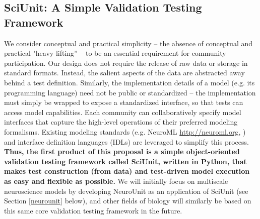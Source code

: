 \documentclass[a4paper,12pt]{article}
\begin{document}
\subsection{SciUnit: A Simple Validation Testing Framework}
We consider conceptual and practical simplicity -- the absence of conceptual and practical "heavy-lifting'' -- to be an essential requirement for community participation. Our design does not require the release of raw data or storage in standard formats. Instead, the salient aspects of the data are abstracted away behind a test definition. Similarly, the implementation details of a model (e.g. its programming language) need not be public or standardized -- the implementation must simply be wrapped to expose a standardized interface, so that tests can access model capabilities. Each community can collaboratively specify model interfaces that capture the high-level operations of their preferred modeling formalisms. Existing modeling standards (e.g. NeuroML \url{http://neuroml.org}, \cite{gleeson2010}) and interface definition languages (IDLs) \cite{bachmann2008} are leveraged to simplify this process. \textbf{Thus, the first product of this proposal is a simple object-oriented validation testing framework called \textbf{SciUnit}, written in Python, that makes test construction (from data) and test-driven model execution as easy and flexible as possible.} We will initially focus on multiscale neuroscience models by developing NeuroUnit as an application of SciUnit (see Section \ref{neurounit} below), and other fields of biology will similarly be based on this same core validation testing framework in the future. 
\end{document}
